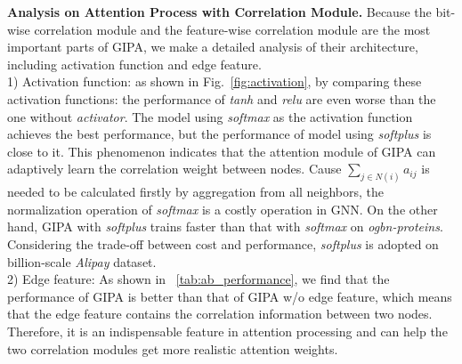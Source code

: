 \documentclass[runningheads]{llncs}
\newcommand{\model}{GIPA\xspace}
\begin{document}
\noindent \textbf{Analysis on Attention Process with Correlation Module.} Because the bit-wise correlation module and the feature-wise correlation module are the most important parts of \model, we make a detailed analysis of their architecture, including activation function and edge feature.
\\
1) Activation function: as shown in Fig.~\ref{fig:activation}, by comparing these activation functions: the performance of \textit{tanh} and \textit{relu} are even worse than the one without \textit{activator}.
The model using \textit{softmax} as the activation function achieves the best performance, but the performance of model using \textit{softplus} is close to it.
This phenomenon indicates that the attention module of \model can adaptively learn the correlation weight between nodes. 
Cause $\sum_{j\in N(i)}a_{ij}$ is needed to be calculated firstly by aggregation from all neighbors, the normalization operation of \textit{softmax} is a costly operation in GNN. 
On the other hand, \model with \textit{softplus} trains faster than that with \textit{softmax} on \textit{ogbn-proteins}.
Considering the trade-off between cost and performance, \textit{softplus} is adopted on billion-scale \textit{Alipay} dataset.
\\
2) Edge feature: As shown in \tablename~\ref{tab:ab_performance}, we find that the performance of \model is better than that of \model w/o edge feature, which means that the edge feature contains the correlation information between two nodes. Therefore, it is an indispensable feature in attention processing and can help the two correlation modules get more realistic attention weights.
\end{document}
